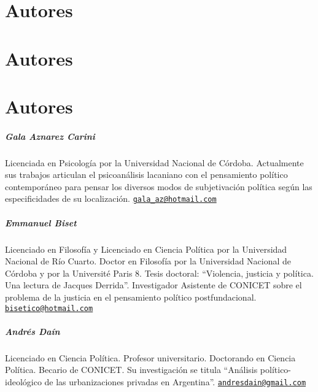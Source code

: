 \ifPDF
\chapter[\hspace{1.5pc}Autores]{Autores}
\setcounter{PrimPag}{\theCurrentPage}
\fi

\ifBNPDF
\chapter[\hspace{1.5pc}Autores]{Autores}
\fi

\ifHTMLEPUB
\chapter{Autores}
\fi


\paragraph{Gala Aznarez Carini}


Licenciada en Psicología por la Universidad Nacional de Córdoba. Actualmente sus trabajos articulan el psicoanálisis lacaniano con el pensamiento político contemporáneo para pensar los diversos modos de subjetivación política según las especificidades de su localización. \href{mailto:gala\_az@hotmail.com}{\texttt{gala\_az@hotmail.com}}

\paragraph{Emmanuel Biset}


Licenciado en Filosofía y Licenciado en Ciencia Política por la Universidad Nacional de Río Cuarto. Doctor en Filosofía por la Universidad Nacional de Córdoba y por la Université Paris 8. Tesis doctoral: \enquote{Violencia, justicia y política. Una lectura de Jacques Derrida}. Investigador Asistente de CONICET sobre el problema de la justicia en el pensamiento político postfundacional. \href{mailto:bisetico@hotmail.com}{\texttt{bisetico@hotmail.com}}


\paragraph{Andrés Daín}


Licenciado en Ciencia Política. Profesor universitario. Doctorando en Ciencia Política. Becario de CONICET. Su investigación se titula \enquote{Análisis político-ideológico de las urbanizaciones privadas en Argentina}. \href{mailto:andresdain@gmail.com}{\texttt{andresdain@gmail.com}}


